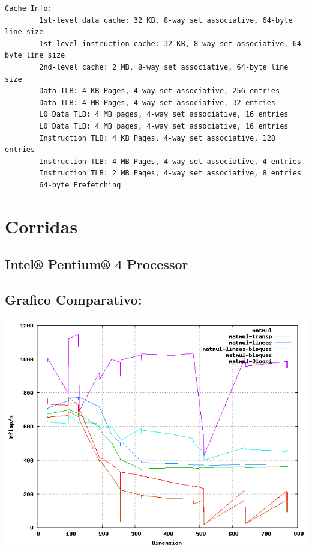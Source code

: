 \documentclass[a4paper,10pt]{article}
\begin{document}
\begin{verbatim}
Cache Info:
        1st-level data cache: 32 KB, 8-way set associative, 64-byte line size
        1st-level instruction cache: 32 KB, 8-way set associative, 64-byte line size
        2nd-level cache: 2 MB, 8-way set associative, 64-byte line size
        Data TLB: 4 KB Pages, 4-way set associative, 256 entries
        Data TLB: 4 MB Pages, 4-way set associative, 32 entries
        L0 Data TLB: 4 MB pages, 4-way set associative, 16 entries
        L0 Data TLB: 4 MB pages, 4-way set associative, 16 entries
        Instruction TLB: 4 KB Pages, 4-way set associative, 128 entries
        Instruction TLB: 4 MB Pages, 4-way set associative, 4 entries
        Instruction TLB: 2 MB Pages, 4-way set associative, 8 entries
        64-byte Prefetching
\end{verbatim}

\clearpage
\section{Corridas}

\subsection{Intel® Pentium® 4 Processor}


\clearpage

\clearpage

\clearpage

\clearpage

\clearpage

\subsection{Grafico Comparativo: }
\hspace{-2cm}
\includegraphics[width=15cm, bb=0 0 640 480]{./pentium4-plot.png}
\clearpage
\end{document}
